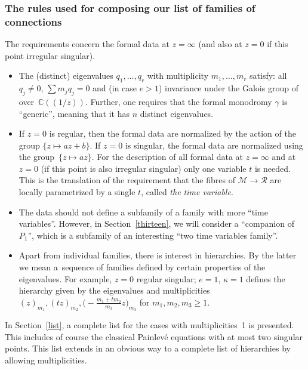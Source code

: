 \documentclass[pdftex]{sigma}
\numberwithin{equation}{section}
\begin{document}
\subsubsection{The rules used for composing our list of families of connections}
The requirements concern the formal data at $z=\infty$ (and also at $z=0$ if this point irregular singular).
\begin{itemize}\itemsep=0pt
\item[R1.] The (distinct) eigenvalues $q_1,\dots , q_r$ with multiplicity $m_1,\dots ,m_r$
 satisfy: all $q_j\neq 0$, $\sum m_j q_j=0$ and (in case $e>1$) invariance under the Galois group of 
over~${\mathbb{C}(\!(1/z)\!)}$.
 Further, one requires that the formal monodromy $\gamma$ is ``generic'', meaning that it has $n$ distinct eigenvalues.

 \item[R2.] If $z=0$ is regular, then the formal data are normalized by the action of the group $\{z\mapsto az+b\}$. If $z=0$ is singular,
 the formal data are normalized using the group~${\{z\mapsto az\}}$. For the description of all formal data at $z=\infty$ and at $z=0$ (if this point is also irregular singular) only one variable $t$ is needed. This is the translation of the requirement that the fibres of $\mathcal{M}\rightarrow \mathcal{R}$ are locally parametrized by a single $t$, called {\it the time variable}.

 \item[R3.] The data should not define a subfamily of a family with more ``time variables''. However, in Section~\ref{thirteen}, we will consider
 a ``companion of $ P_1$'', which is a subfamily of an interesting ``two time variables family''.

 \item[R4.] Apart from individual families, there is interest in hierarchies. By the latter we mean a~sequence of families defined by certain properties of the eigenvalues. For example, $z=0$ regular singular; $e=1$, $\kappa =1$ defines the hierarchy given by the eigenvalues and multiplicities
 $ (z)_{m_1}, (tz)_{m_2}, \bigl( -\frac{m_1+tm_2}{m_3}z\bigr)_{m_3}$ for $m_1,m_2,m_3\geq 1$.
 \end{itemize}

In Section~\ref{list}, a complete list for the cases with multiplicities~1 is presented. This includes of course the classical Painlev\'e equations
with at most two singular points. This list extends in an obvious way to a complete list of hierarchies by allowing multiplicities.
\end{document}
